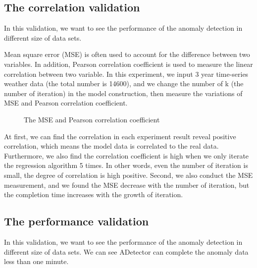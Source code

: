 \documentclass{vgtc}                          %
\begin{document}
\subsection{The correlation validation}

In this validation, we want to see the performance of the anomaly detection in different size of data sets. 

Mean square error (MSE) is often used to account for the difference between two variables. In addition, Pearson correlation coefficient is used to measure the linear correlation between two variable. In this experiment, we input 3 year time-series weather data (the total number is 14600), and we change the number of k (the number of iteration) in the model construction, then measure the variations of MSE and Pearson correlation coefficient. 
\begin{figure}[htb]
	\caption{The MSE and Pearson correlation coefficient}
\end{figure}

At first, we can find the correlation in each experiment result reveal positive correlation, which means the model data is correlated to the real data. Furthermore, we also find the correlation coefficient is high when we only iterate the regression algorithm 5 times. In other words, even the number of iteration is small, the degree of correlation is high positive. Second, we also conduct the MSE measurement, and we found the MSE decrease with the number of iteration, but the completion time increases with the growth of iteration.
	
\subsection{The performance validation}
In this validation, we want to see the performance of the anomaly detection in different size of data sets. We can see ADetector can complete the anomaly data less than one minute. 
\end{document}
